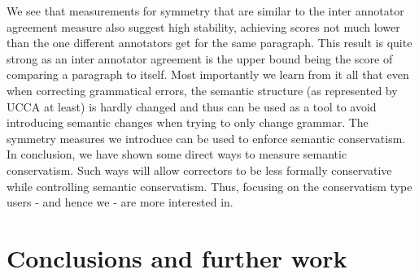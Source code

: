 \documentclass[english]{article}
\begin{document}
	We see that measurements for symmetry that are similar to the inter
	annotator agreement measure also suggest high stability, achieving
	scores not much lower than the one different annotators get for the
	same paragraph. This result is quite strong as an inter annotator
	agreement is the upper bound being the score of comparing a paragraph to itself. 
	Most importantly we learn from it all that even when correcting grammatical errors, the semantic structure (as represented by UCCA at least) is hardly changed and thus can be used as a tool to avoid introducing semantic changes when trying to only change grammar. 
	The symmetry measures we introduce can be used to enforce semantic conservatism.
	In conclusion, we have shown some direct ways to measure
	semantic conservatism. Such ways will allow correctors to be less formally conservative while controlling semantic conservatism. Thus, focusing on the conservatism type users - and hence we - are more interested in.


\section{Conclusions and further work}



\appendix
\section{}
\end{document}
